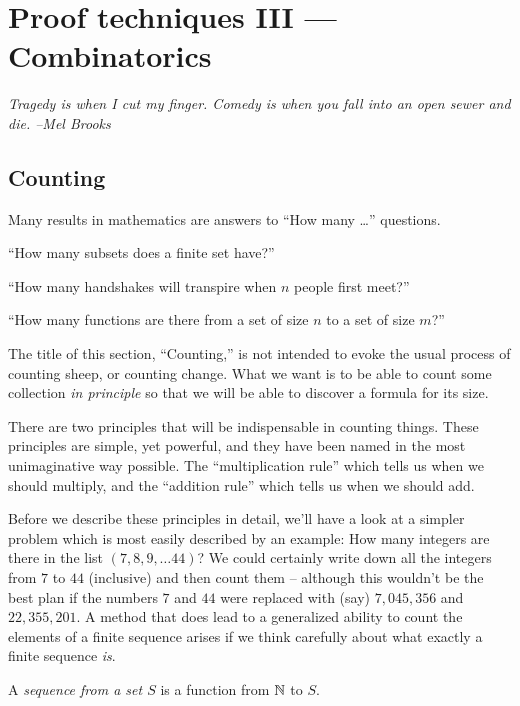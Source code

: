 
\chapter{Proof techniques III --- Combinatorics}

{\em Tragedy is when I cut my finger. Comedy is when you fall into an open sewer and die. --Mel Brooks }

\section{Counting}
\label{sec:counting}

Many results in mathematics are answers to ``How many \ldots'' questions.

\noindent ``How many subsets does a finite set have?''

\noindent ``How many handshakes will transpire when $n$ people first meet?''

\noindent ``How many functions are there from a set of size $n$ to a set of size $m$?''

The title of this section, ``Counting,'' is not intended to evoke the usual
process of counting sheep, or counting change.  What we want is to be able
to count some collection \emph{in principle} so that we will be able to 
discover a formula for its size.

There are two principles that will be indispensable in counting things.
These principles are simple, yet powerful, and they have been named in
the most unimaginative way possible.  The ``multiplication rule'' which
tells us when we should multiply, and the ``addition rule'' which tells
us when we should add.  

Before we describe these principles in detail,
we'll have a look at a simpler problem which is most easily described
by an example: How many integers are there in the list $(7,8,9,\ldots 44)$?
We could certainly write down all the integers from $7$ to $44$ (inclusive) 
and then count them -- although this wouldn't be the best plan if the numbers
$7$ and $44$ were replaced with (say) $7,045,356$ and $22,355,201$.  A method
that does lead to a generalized ability to count the elements of a finite
sequence arises if we think carefully about what exactly a finite sequence 
\emph{is}.  

\begin{defi}
A \emph{sequence from a set $S$} is a function from 
${\mathbb N}$ to $S$.
\end{defi}

